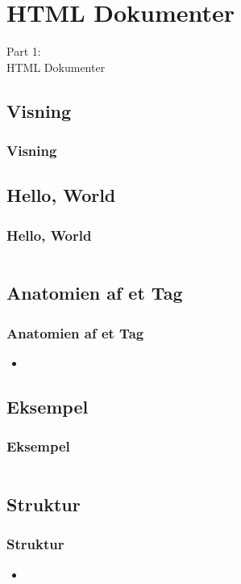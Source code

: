 \section{HTML Dokumenter}
\begin{frame}
    \vspace{25mm}
    \begin{center}
        \Huge{Part 1:\\HTML Dokumenter}
    \end{center}
\end{frame}

\subsection{Visning}
\begin{frame}
    \frametitle{Visning}
    
\end{frame}

\subsection{Hello, World}
\begin{frame}
    \frametitle{Hello, World}
    \inputminted{html}{../src/frontend/iteration1_html_hello/index.html}
\end{frame}

\subsection{Anatomien af et Tag}
\begin{frame}
    \frametitle{Anatomien af et Tag}
    \begin{itemize}
      \item 
    \end{itemize}
\end{frame}

\subsection{Eksempel}
\begin{frame}
    \frametitle{Eksempel}
    \inputminted[breaklines=true]{html}{../src/frontend/iteration1_html/index.html}
\end{frame}

\subsection{Struktur}
\begin{frame}
    \frametitle{Struktur}
    \begin{itemize}
      \item 
    \end{itemize}
\end{frame}

